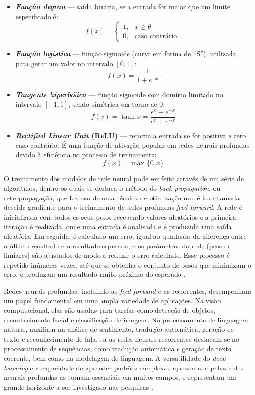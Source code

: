 \documentclass[
	12pt,				%
	openright,			%
	oneside,			%
	a4paper,			%
	tccpreliminar,			%
	]{ABNT-DC-UEL}
\begin{document}
\begin{itemize}
    \item \textbf{\textit{Função degrau}} --- saída binária, se a entrada for maior que um limite especificado $\theta$:
    \[f(x) = \begin{cases}
        1, & x \geq \theta\\
        0, & \text{caso contrário}.
    \end{cases}\]
    \item \textbf{\textit{Função logística}} --- função sigmoide (curva em forma de ``S''), utilizada para gerar um valor no intervalo $[0,1]$:
    \[
        f(x) = \frac{1}{1+e^{-x}}
    \]
    \item \textbf{\textit{Tangente hiperbólica}} --- função sigmoide com domínio limitado no intervalo $[-1,1]$, sendo simétrica em torno de $0$:
    \[
        f(x) = \tanh{x} = \frac{e^x - e^{-x}}{e^x + e^{-x}}
    \]
    \item \textbf{\textit{Rectified Linear Unit} (ReLU)} --- retorna a entrada se for positiva e zero caso contrário. É uma função de ativação popular em redes neurais profundas devido à eficiência no processo de treinamento:
    \[
        f(x) = \text{max }\{0, x\}
    \]
\end{itemize}

O treinamento dos modelos de rede neural pode ser feito através de um série de algoritmos, dentre os quais se destaca o método do \textit{back-propagation}, ou retropropagação, que faz uso de uma técnica de otimização numérica chamada descida gradiente para o treinamento de redes profundas \textit{feed-forward}. A rede é inicializada com todos os seus pesos recebendo valores aleatórios e a primeira iteração é realizada, onde uma entrada é analisada e é produzida uma saída aleatória. Em seguida, é calculado um erro, igual ao quadrado da diferença entre o último resultado e o resultado esperado, e os parâmetros da rede (pesos e limiares) são ajustados de modo a reduzir o erro calculado. Esse processo é repetido inúmeras vezes, até que se obtenha o conjunto de pesos que minimizam o erro, e produzam um resultado muito próximo do esperado \cite{krogh:08}.

Redes neurais profundas, incluindo as \textit{feed-forward} e as recorrentes, desempenham um papel fundamental em uma ampla variedade de aplicações. Na visão computacional, elas são usadas para tarefas como detecção de objetos, reconhecimento facial e classificação de imagens. No processamento de linguagem natural, auxiliam na análise de sentimento, tradução automática, geração de texto e reconhecimento de fala. Já as redes neurais recorrentes destacam-se no processamento de sequências, como tradução automática e geração de texto coerente, bem como na modelagem de linguagem. A versatilidade do \textit{deep learning} e a capacidade de aprender padrões complexos apresentada pelas redes neurais profundas as tornam essenciais em muitos campos, e representam um grande horizonte a ser investigado nas pesquisas \cite{sharma:21}.
\end{document}
